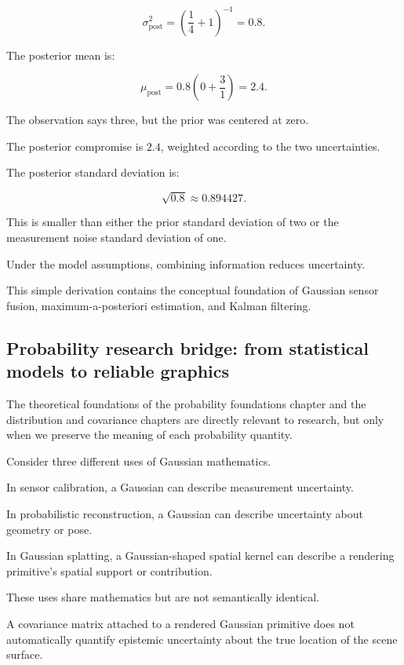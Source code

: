 \[
 \sigma_{\mathrm{post}}^2= \left(\frac14+1\right)^{-1} =\boxed{0.8}.
\]

The posterior mean is:

\[
 \mu_{\mathrm{post}} = 0.8\left(0+\frac31\right) =\boxed{2.4}.
\]

The observation says three, but the prior was centered at zero.

The posterior compromise is \(2.4\), weighted according to the two uncertainties.

The posterior standard deviation is:

\[
 \sqrt{0.8}\approx0.894427.
\]

This is smaller than either the prior standard deviation of two or the measurement noise standard deviation of one.

Under the model assumptions, combining information reduces uncertainty.

This simple derivation contains the conceptual foundation of Gaussian sensor fusion, maximum-a-posteriori estimation, and Kalman filtering.

\subsection{Probability research bridge: from statistical models to reliable graphics}\label{02-foundations-ii-ch031-probability-research-bridge-from-statistical-models-to-reliable-graphics}

\hypertarget{02-foundations-ii-ch031-probability-research-bridge-from-statistical-models-to-reliable-graphics}{}

The theoretical foundations of the probability foundations chapter and the distribution and covariance chapters are directly relevant to research, but only when we preserve the meaning of each probability quantity.

Consider three different uses of Gaussian mathematics.

In sensor calibration, a Gaussian can describe measurement uncertainty.

In probabilistic reconstruction, a Gaussian can describe uncertainty about geometry or pose.

In Gaussian splatting, a Gaussian-shaped spatial kernel can describe a rendering primitive's spatial support or contribution.

These uses share mathematics but are not semantically identical.

A covariance matrix attached to a rendered Gaussian primitive does not automatically quantify epistemic uncertainty about the true location of the scene surface.

